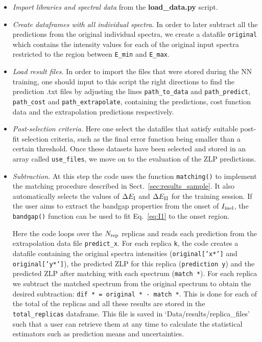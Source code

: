 \begin{itemize}
  
\item {\it Import libraries and spectral data} from the {\bf load\_data.py} script.

\item {\it Create dataframes with all individual spectra.}
In order to later subtract all the predictions from the original individual spectra, we create a datafile
{\tt original} which contains the intensity values for each of the original input spectra restricted to the region between
 {\tt E\_min} and {\tt E\_max}.

\item {\it Load result files.}
In order to import the files that were stored during the NN training, 
one should input to this script the right directions to find the prediction .txt files
by adjusting the lines {\tt path\_to\_data} and {\tt path\_predict}, {\tt path\_cost} and {\tt path\_extrapolate}, 
containing the predictions, cost function data and the extrapolation predictions respectively.

\item {\it Post-selection criteria.}
  Here one select the datafiles that satisfy suitable post-fit selection
  criteria, such as the final error function being smaller
  than a certain threshold. 
Once these datasets have been selected and stored in an array called {\tt use\_files},
we move on to the evaluation of the ZLP predictions. 

\item {\it Subtraction.}
 At this step the code uses the function {\tt matching()} to
  implement the matching procedure
  described in Sect.~\ref{sec:results_sample}.
  It also automatically selects the
  values of $\Delta E_{\rm I}$ and $\Delta E_{\rm II}$ for the training session.
  If the user aims to extract the bandgap properties
  from the onset of $I_{\rm inel}$, 
  the  {\tt bandgap()} function can be used to
  fit Eq.~\ref{eq:I1} to the onset region.

Here the code loops over the $N_{\rm rep}$ replicas and reads each prediction from the extrapolation data file {\tt predict\_x}.
%
For each replica {\tt k}, the code creates a datafile containing the original spectra intensities 
({\tt original['x*']} and {\tt original['y*']}), the predicted ZLP for this replica ({\tt prediction y}) 
and the predicted ZLP after matching with each spectrum ({\tt match *}). 
%
For each replica we subtract the matched spectrum from the original spectrum 
to obtain the desired subtraction: {\tt dif * = original * - match *}. 
%
This is done for each of the total of the replicas and all these results are stored in the  {\tt total\_replicas} dataframe. 
%
This file is saved in `Data/results/replica\_files' such that a user
can retrieve them  at any time to calculate the
statistical estimators such as prediction means and uncertainties. 


\end{itemize}
